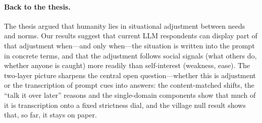 \documentclass[11pt]{article}
\begin{document}
\paragraph{Back to the thesis.}
The thesis argued that humanity lies in situational adjustment between needs and norms. Our results suggest that current LLM respondents can display part of that adjustment when---and only when---the situation is written into the prompt in concrete terms, and that the adjustment follows social signals (what others do, whether anyone is caught) more readily than self-interest (weakness, ease). The two-layer picture sharpens the central open question---whether this is adjustment or the transcription of prompt cues into answers: the content-matched shifts, the ``talk it over later'' reasons and the single-domain components show that much of it is transcription onto a fixed strictness dial, and the village null result shows that, so far, it stays on paper.
\end{document}

